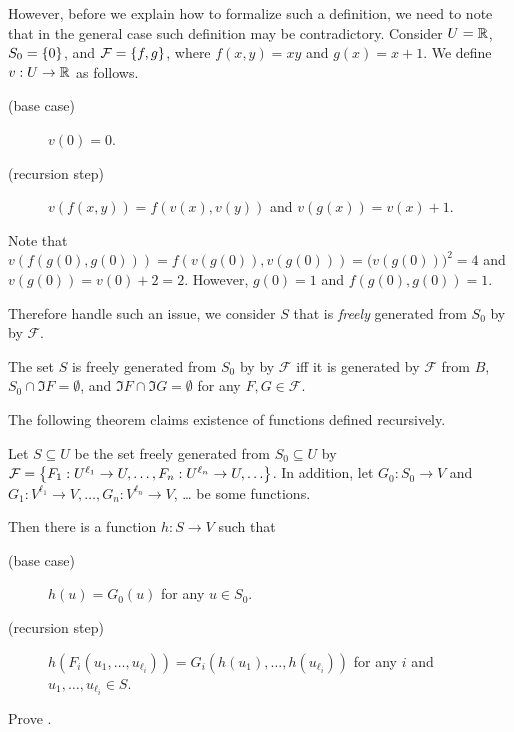 However, before we explain how to formalize such a definition, we need to note
that in the general case such definition may be contradictory. Consider
$U = {\mathbb{R}}$, $S_0 = \set{0}$, and $\mathcal{F} = \set{f, g}$, where $f(x, y) = xy$
and $g(x) = x + 1$. We define $v : U \to {\mathbb{R}}$ as follows.
\begin{description}
  \item [(base case)] $v(0) = 0$.
  \item[(recursion step)] $v(f(x, y)) = f(v(x), v(y))$ and
    $v(g(x)) = v(x) + 1$.
\end{description}
Note that $v(f(g(0), g(0))) = f(v(g(0)), v(g(0))) = \big(v(g(0))\big)^2 = 4$
and $v(g(0)) = v(0) + 2 = 2$.
However, $g(0) = 1$ and $f(g(0), g(0)) = 1$.

Therefore handle such an issue, we consider $S$ that is \emph{freely} generated
from $S_0$ by by $\mathcal{F}$.
\begin{definition}
  The set $S$ is freely generated from $S_0$ by by $\mathcal{F}$ iff it is
  generated by $\mathcal{F}$ from $B$,
  $S_0 \cap \Im F = \emptyset$, and $\Im F \cap \Im G = \emptyset$ for any
  $F, G \in \mathcal{F}$.
\end{definition}

The following theorem claims existence of functions defined recursively.
\begin{theorem}
\label{theorem:recursion-principle}
  Let $S \subseteq U$ be the set freely generated from $S_0 \subseteq U$ by
  $\mathcal{F} =
    \set{F_1 : U^{\ell_1} \to U, \dots, F_n : U^{\ell_n} \to U, \dots}$.
  In addition, let $G_0 : S_0 \to V$ and
  $G_1 : V^{\ell_1} \to V, \dots, G_n : V^{\ell_n} \to V$, \dots
  be some functions.

  Then there is a function $h : S \to V$ such that
  \begin{description}
        \item [(base case)] $h(u) = G_0(u)$ for any $u \in S_0$.
        \item[(recursion step)] $h(F_i(u_1, \dots, u_{\ell_i})) =
            G_i(h(u_1), \dots, h(u_{\ell_i}))$ for any $i$ and
            $u_1, \dots, u_{\ell_i} \in S$.
  \end{description}
\end{theorem}

\begin{exercise}
  Prove .
\end{exercise}

